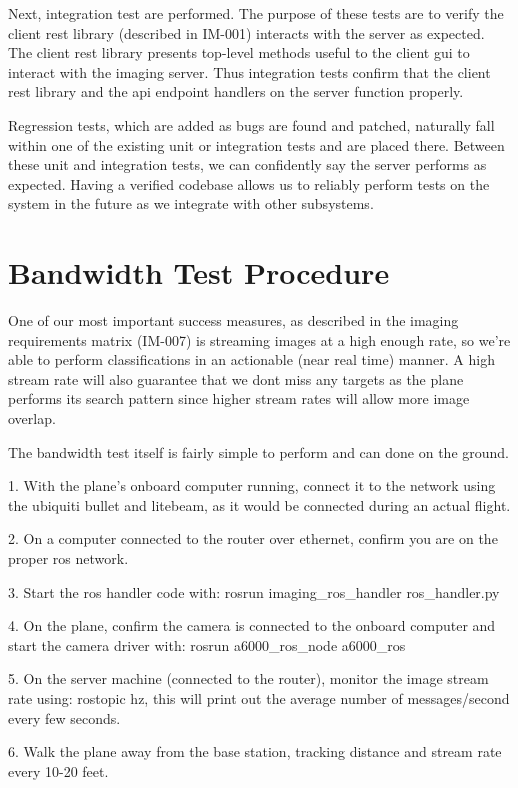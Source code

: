 \documentclass[]{auvsi_doc}
\begin{document}
Next, integration test are performed. The purpose of these tests are to verify the
client rest library (described in IM-001) interacts with the server as expected.
The client rest library presents top-level methods useful to the client gui to 
interact with the imaging server. Thus integration tests confirm that the client
rest library and the api endpoint handlers on the server function properly.

Regression tests, which are added as bugs are found and patched, naturally fall
within one of the existing unit or integration tests and are placed there. Between 
these unit and integration tests, we can confidently say the server performs
as expected. Having a verified codebase allows us to reliably perform tests on 
the system in the future as we integrate with other subsystems.

\section{Bandwidth Test Procedure}

One of our most important success measures, as described in the imaging requirements
matrix (IM-007) is streaming images at a high enough rate, so we're able to perform
classifications in an actionable (near real time) manner. A high stream rate will 
also guarantee that we dont miss any targets as the plane performs its search pattern
since higher stream rates will allow more image overlap. 

The bandwidth test itself is fairly simple to perform and can done on the ground.

1. With the plane's onboard computer running, connect it to the network using
the ubiquiti bullet and litebeam, as it would be connected during an actual flight.

2. On a computer connected to the router over ethernet, confirm you are on the proper ros network.

3. Start the ros handler code with: rosrun imaging\_ros\_handler ros\_handler.py

4. On the plane, confirm the camera is connected to the onboard computer and start
the camera driver with: rosrun a6000\_ros\_node a6000\_ros

5. On the server machine (connected to the router), monitor the image stream rate
using: rostopic hz, this will print out the average number of messages/second every 
few seconds.

6. Walk the plane away from the base station, tracking distance and stream rate
every 10-20 feet.
\end{document}

